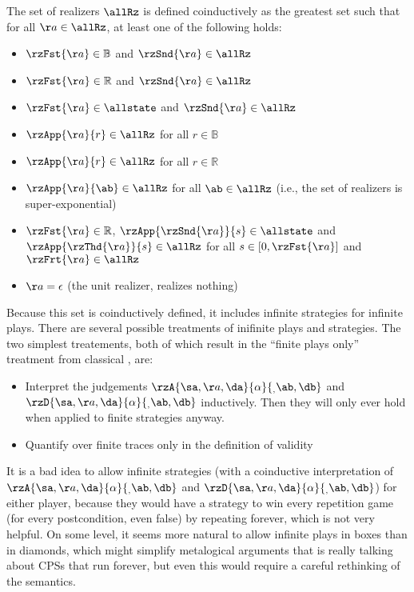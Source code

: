 The set of realizers $\allRz$ is defined coinductively as the greatest set such that for all $\aa \in \allRz$, at least one of the following holds:
\begin{itemize}
\item $\rzFst{\aa} \in \mathbb{B}$ and $\rzSnd{\aa} \in \allRz$
\item $\rzFst{\aa} \in \mathbb{R}$ and $\rzSnd{\aa} \in \allRz$
\item $\rzFst{\aa} \in \allstate$ and $\rzSnd{\aa} \in \allRz$
\item $\rzApp{\aa}{r} \in \allRz$ for all $r \in \mathbb{B}$
\item $\rzApp{\aa}{r} \in \allRz$ for all $r \in \mathbb{R}$
\item $\rzApp{\aa}{\ab} \in \allRz$ for all $\ab \in \allRz$ (i.e., the set of realizers is super-exponential)
\item $\rzFst{\aa} \in \mathbb{R}$, $\rzApp{\rzSnd{\aa}}{s} \in \allstate$ and $\rzApp{\rzThd{\aa}}{s} \in \allRz$ for all $s \in [0,\rzFst{\aa}]$ and $\rzFrt{\aa}\in\allRz$
\item $\aa = \epsilon$ (the unit realizer, realizes nothing)
\end{itemize}
Because this set is coinductively defined, it includes infinite strategies for infinite plays.
There are several possible treatments of inifinite plays and strategies.
The two simplest treatements, both of which result in the ``finite plays only'' treatment from classical \dGL, are:
\begin{itemize}
\item 
 Interpret the judgements $\rzA{\sa,\aa,\da}{\alpha}{\sb,\ab,\db}$ and $\rzD{\sa,\aa,\da}{\alpha}{\sb,\ab,\db}$ inductively.
 Then they will only ever hold when applied to finite strategies anyway.
\item Quantify over finite traces only in the definition of validity
\end{itemize}
It is a bad idea to allow infinite strategies (with a coinductive interpretation of $\rzA{\sa,\aa,\da}{\alpha}{\sb,\ab,\db}$ and $\rzD{\sa,\aa,\da}{\alpha}{\sb,\ab,\db}$) for either player, 
because they would have a strategy to win every repetition game (for every postcondition, even false) by repeating forever, which is not very helpful.
On some level, it seems more natural to allow infinite plays in boxes than in diamonds, which might simplify metalogical arguments that \CdGL is really talking about CPSs that run forever, but even this would require a careful rethinking of the semantics.

